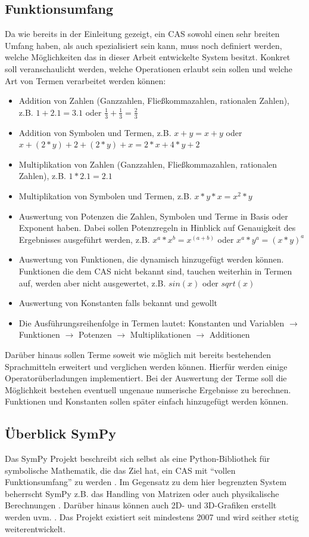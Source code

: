 \documentclass[11pt,a4paper, ngerman]{article}
\begin{document}
\subsection{Funktionsumfang}
Da wie bereits in der Einleitung gezeigt, ein CAS sowohl einen sehr breiten Umfang haben, als auch spezialisiert sein kann, muss noch definiert werden, welche Möglichkeiten das in dieser Arbeit entwickelte System besitzt. Konkret soll veranschaulicht werden, welche Operationen erlaubt sein sollen und welche Art von Termen verarbeitet werden können:
\begin{itemize}
    \item Addition von Zahlen (Ganzzahlen, Fließkommazahlen, rationalen Zahlen), z.B. $1+2.1 = 3.1$ oder $\frac{1}{3} + \frac{1}{3} = \frac{2}{3}$
    \item Addition von Symbolen und Termen, z.B. $x+y = x+y$ oder $x+(2*y)+2+(2*y)+x = 2*x+4*y+2$
    \item Multiplikation von Zahlen (Ganzzahlen, Fließkommazahlen, rationalen Zahlen), z.B. $1*2.1 = 2.1$
    \item Multiplikation von Symbolen und Termen, z.B. $x*y*x = x^2*y$
    \item Auswertung von Potenzen die Zahlen, Symbolen und Terme in Basis oder Exponent haben. Dabei sollen Potenzregeln in Hinblick auf Genauigkeit des Ergebnisses ausgeführt werden, z.B. $x^a*x^b=x^{(a+b)}$ oder $x^a*y^a = (x*y)^a$
    \item Auswertung von Funktionen, die dynamisch hinzugefügt werden können. Funktionen die dem CAS nicht bekannt sind, tauchen weiterhin in Termen auf, werden aber nicht ausgewertet, z.B. $sin(x)$ oder $sqrt(x)$
    \item Auswertung von Konstanten falls bekannt und gewollt
    \item Die Ausführungsreihenfolge in Termen lautet: Konstanten und Variablen $\rightarrow$ Funktionen $\rightarrow$ Potenzen $\rightarrow$ Multiplikationen $\rightarrow$ Additionen
\end{itemize}

Darüber hinaus sollen Terme soweit wie möglich mit bereits bestehenden Sprachmitteln erweitert und verglichen werden können. Hierfür werden einige Operatorüberladungen implementiert. Bei der Auswertung der Terme soll die Möglichkeit bestehen eventuell ungenaue numerische Ergebnisse zu berechnen. Funktionen und Konstanten sollen später einfach hinzugefügt werden können.

\subsection{Überblick SymPy}
Das SymPy Projekt beschreibt sich selbst als eine Python-Bibliothek für symbolische Mathematik, die das Ziel hat, ein CAS mit ``vollen Funktionsumfang'' zu werden \cite{SymPyAbout}. Im Gegensatz zu dem hier begrenzten System beherrscht SymPy z.B. das Handling von Matrizen \cite[S. 11]{SympyPeerJ} oder auch physikalische Berechnungen \cite[S. 14 ff.]{SympyPeerJ}. Darüber hinaus können auch 2D- und 3D-Grafiken erstellt werden uvm. \cite[S. 4 ff.]{SympyPeerJ}. Das Projekt existiert seit mindestens 2007 \cite{SymPyFirstCommit} und wird seither stetig weiterentwickelt.
\end{document}
